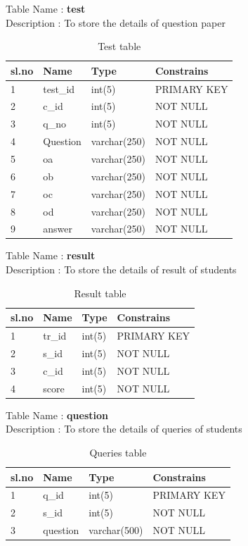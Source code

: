 \begin{table}[!h]
Table Name    :    {\bf test}\\
Description      :  To store the details of question paper


\begin{tabular}{|l|l|l|l|}
\hline
\bf sl.no & \bf Name     & \bf Type         & \bf Constrains  \\ 
\hline
1     & test\_id & int(5)       & PRIMARY KEY \\ 
\hline
2     & c\_id    & int(5)       &       NOT NULL      \\ 
\hline
3     & q\_no    & int(5)       &          NOT NULL   \\ 
\hline
4     & Question & varchar(250) &    NOT NULL         \\ 
\hline
5     & oa       & varchar(250) &        NOT NULL     \\ 
\hline
6     & ob       & varchar(250) &      NOT NULL       \\ 
\hline
7     & oc       & varchar(250) &      NOT NULL       \\ 
\hline
8     & od       & varchar(250) &        NOT NULL     \\ 
\hline
9     & answer   & varchar(250) &       NOT NULL      \\ 
\hline
\end{tabular}
\caption{Test table}
\end{table}

\begin{table}[!h]
Table Name    :    {\bf result}\\
Description      :  To store the details of result of students


\begin{tabular}{|l|l|l|l|}
\hline
\bf sl.no &  \bf Name   &\bf  Type   &\bf Constrains  \\ 
\hline
1     & tr\_id & int(5) & PRIMARY KEY \\ 
\hline
2     & s\_id  & int(5) &       NOT NULL      \\ 
\hline
3     & c\_id  & int(5) &       NOT NULL      \\ 
\hline
4     & score  & int(5) &      NOT NULL       \\ 
\hline
\end{tabular}
\caption{Result table}
\end{table}

\begin{table}[!h]
Table Name    :    {\bf question}\\
Description      :  To store the details of queries of students


\begin{tabular}{|l|l|l|l|}
\hline
 \bf sl.no & \bf  Name     & \bf  Type         & \bf Constrains  \\ 
\hline
1     & q\_id    & int(5)       & PRIMARY KEY \\ 
\hline
2     & s\_id    & int(5)       &    NOT NULL         \\
\hline
3     & question & varchar(500) &    NOT NULL         \\ 
\hline
\end{tabular}
\caption{Queries table}
\end{table}

